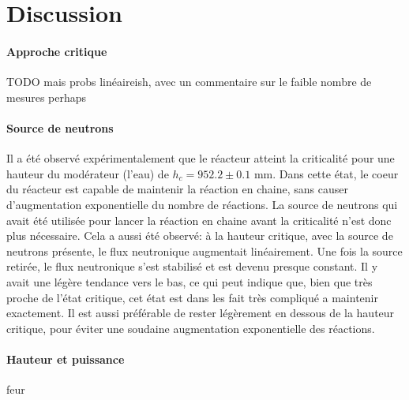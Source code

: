 \section{Discussion}

\paragraph{Approche critique}
TODO mais probs linéaireish, avec un commentaire sur le faible nombre de mesures perhaps

\paragraph{Source de neutrons}
Il a été observé expérimentalement que le réacteur atteint la criticalité pour une hauteur du modérateur (l'eau) de \(h_c = 952.2 \pm 0.1\) mm. Dans cette état, le coeur du réacteur est capable de maintenir la réaction en chaine, sans causer d'augmentation exponentielle du nombre de réactions. La source de neutrons qui avait été utilisée pour lancer la réaction en chaine avant la criticalité n'est donc plus nécessaire. Cela a aussi été observé: à la hauteur critique, avec la source de neutrons présente, le flux neutronique augmentait linéairement. Une fois la source retirée, le flux neutronique s'est stabilisé et est devenu presque constant. Il y avait une légère tendance vers le bas, ce qui peut indique que, bien que très proche de l'état critique, cet état est dans les fait très compliqué a maintenir exactement. Il est aussi préférable de rester légèrement en dessous de la hauteur critique, pour éviter une soudaine augmentation exponentielle des réactions.

\paragraph{Hauteur et puissance}
feur